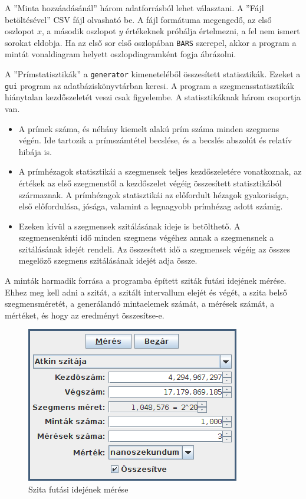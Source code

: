 A ''Minta hozzáadásánál'' három adatforrásból lehet választani.
A ''Fájl betöltésével'' CSV fájl olvasható be. A fájl formátuma megengedő, az első oszlopot $x$, a második oszlopot $y$ értékeknek próbálja értelmezni, a fel nem ismert sorokat eldobja.
Ha az első sor első oszlopában \texttt{BARS} szerepel, akkor a program a mintát vonaldiagram helyett oszlopdiagramként fogja ábrázolni.

A ''Prímstatisztikák'' a \texttt{generator} kimeneteléből összesített statisztikák.
Ezeket a \texttt{gui} program az adatbáziskönyvtárban keresi.
A program a szegmensstatisztikák hiánytalan kezdőszeletét veszi csak figyelembe.
A statisztikáknak három csoportja van.
\begin{itemize}
\item A prímek száma, és néhány kiemelt alakú prím száma minden szegmens végén.
Ide tartozik a prímszámtétel becslése, és a becslés abszolút és relatív hibája is.

\item A prímhézagok statisztikái a szegmensek teljes kezdőszeletére vonatkoznak, az értékek az első szegmenstől a kezdőszelet végéig összesített statisztikából származnak.
A prímhézagok statisztikái az előfordult hézagok gyakorisága, első előfordulása, jósága, valamint a legnagyobb prímhézag adott számig.

\item Ezeken kívül a szegmensek szitálásának ideje is betölthető.
A szegmensenkénti idő minden szegmens végéhez annak a szegmensnek a szitálásának idejét rendeli.
Az összesített idő a szegmensek végéig az összes megelőző szegmens szitálásának idejét adja össze.
\end{itemize}

A minták harmadik forrása a programba épített sziták futási idejének mérése.
Ehhez meg kell adni a szitát, a szitált intervallum elejét és végét, a szita belső szegmensméretét, a generálandó mintaelemek számát, a mérések számát, a mértéket, és hogy az eredményt összesítse-e.

\begin{figure}[h]
\caption{Szita futási idejének mérése}
\centering
\includegraphics[scale=1.0]{measure.png}
\end{figure}

